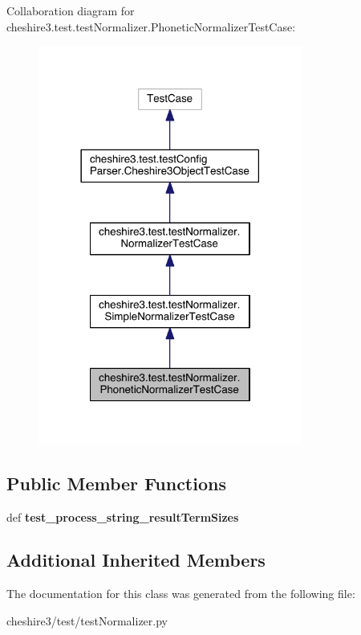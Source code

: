 Collaboration diagram for cheshire3.\-test.\-test\-Normalizer.\-Phonetic\-Normalizer\-Test\-Case\-:
\nopagebreak
\begin{figure}[H]
\begin{center}
\leavevmode
\includegraphics[width=246pt]{classcheshire3_1_1test_1_1test_normalizer_1_1_phonetic_normalizer_test_case__coll__graph}
\end{center}
\end{figure}
\subsection*{Public Member Functions}
\begin{DoxyCompactItemize}
\item 
\hypertarget{classcheshire3_1_1test_1_1test_normalizer_1_1_phonetic_normalizer_test_case_ade7c4758e23ec673f821a85a6d900266}{def {\bfseries test\-\_\-process\-\_\-string\-\_\-result\-Term\-Sizes}}\label{classcheshire3_1_1test_1_1test_normalizer_1_1_phonetic_normalizer_test_case_ade7c4758e23ec673f821a85a6d900266}

\end{DoxyCompactItemize}
\subsection*{Additional Inherited Members}


The documentation for this class was generated from the following file\-:\begin{DoxyCompactItemize}
\item 
cheshire3/test/test\-Normalizer.\-py\end{DoxyCompactItemize}
